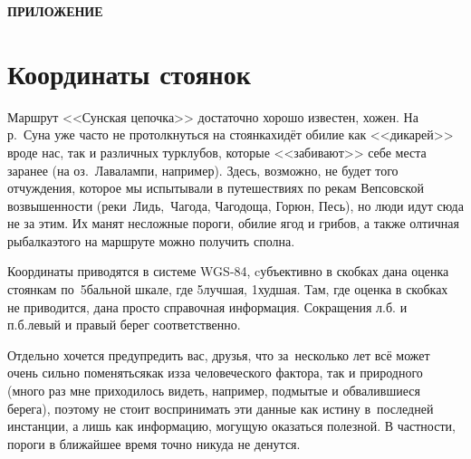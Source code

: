 {
\cleardoublepage
{}
{}
{\hfill\large\textbf{ПРИЛОЖЕНИЕ}}
\section*{Координаты стоянок}
Маршрут <<Сунская цепочка>> достаточно хорошо известен, хожен. На р.\nobreakdash~Суна уже часто не протолкнуться на стоянках\mdash идёт обилие как <<дикарей>> вроде нас, так и различных турклубов, которые <<забивают>> себе места заранее (на оз.\nobreakdash~Лавалампи, например). Здесь, возможно, не будет того отчуждения, которое мы испытывали в путешествиях по рекам Вепсовской возвышенности (реки~Лидь,~Чагода, Чагодоща, Горюн, Песь\cite{СоболевВепсскаяЛетопись}), но люди идут сюда не за этим. Их манят несложные пороги, обилие ягод и грибов, а также олтичная рыбалка\mdash этого на маршруте можно получить сполна. 

Координаты приводятся в системе WGS-84, cубъективно в скобках дана оценка стоянкам по~5\sdash бальной шкале, где 5\mdash лучшая, 1\mdash худшая. Там, где оценка в скобках не приводится, дана просто справочная информация. Сокращения л.б. и п.б.\mdash левый и правый берег соответственно.

Отдельно хочется предупредить вас, друзья, что за~несколько лет всё может очень сильно поменяться\mdash как из\sdash за человеческого фактора, так и природного (много раз мне приходилось видеть, например, подмытые и обвалившиеся берега), поэтому не стоит воспринимать эти данные как истину в~последней инстанции, а лишь как информацию, могущую оказаться полезной. В частности, пороги в ближайшее время точно никуда не денутся.
%
\newpage 
}
